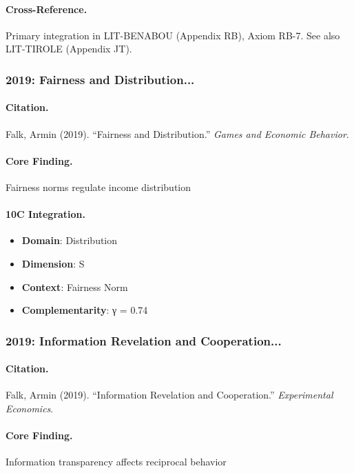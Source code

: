 \paragraph{Cross-Reference.}
Primary integration in LIT-BENABOU (Appendix RB), Axiom RB-7. See also LIT-TIROLE (Appendix JT).


\subsubsection{2019: Fairness and Distribution...}

\paragraph{Citation.}
Falk, Armin (2019). ``Fairness and Distribution.''
\textit{Games and Economic Behavior}.

\paragraph{Core Finding.}
Fairness norms regulate income distribution

\paragraph{10C Integration.}
\begin{itemize}[nosep]
  \item \textbf{Domain}: Distribution
  \item \textbf{Dimension}: S
  \item \textbf{Context}: Fairness Norm
  \item \textbf{Complementarity}: γ = 0.74
\end{itemize}


\subsubsection{2019: Information Revelation and Cooperation...}

\paragraph{Citation.}
Falk, Armin (2019). ``Information Revelation and Cooperation.''
\textit{Experimental Economics}.

\paragraph{Core Finding.}
Information transparency affects reciprocal behavior

